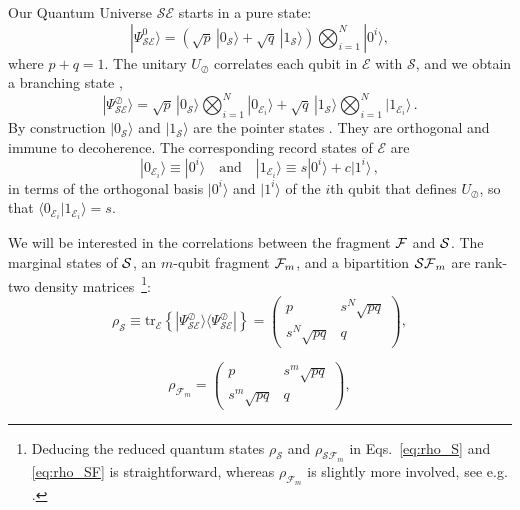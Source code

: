 \documentclass[aps,prl,showpacs,amsmath,amssymb,amsfonts,lengthcheck,twocolumn,longbibliography,superscriptaddress]{revtex4-2}
\newcommand{\ptr}[2]{\mathrm{tr_{#1}}\left\{#2\right\}}
\newcommand{\bra}[1]    {\langle #1|}
\newcommand{\ket}[1]    {| #1 \rangle}
\newcommand{\bk}[2]     {\langle #1 | #2 \rangle}
\newcommand{\cS}        {{\mathcal S}}
\newcommand{\cE}        {{\mathcal E}}
\newcommand{\+}         {\dagger}
\newcommand{\mc}[1]{\mathcal{#1}}
\begin{document}
Our Quantum Universe $\cS\cE$ starts in a pure state:
\begin{equation}
\ket{\Psi_\mathcal{SE}^0} = \left(\sqrt{p}\, \ket { 0_\mathcal{S}} + \sqrt{q}\, \ket { 1_\mathcal{S}} \right) \bigotimes_{i=1}^{N} \ket {0^{i}} ,
\end{equation}
where $p+q=1$. The unitary $U_{\oslash}$ correlates each qubit in $\cE$ with $\mc{S}$,  and we obtain a branching state \cite{blume2005simple},
\begin{equation}
\ket{ \Psi^{\oslash}_\mathcal{SE}} = \sqrt{p}\,  \ket {0_\mathcal{S}} \bigotimes_{i=1}^{N} \ket { 0_{\cE_{i}}} + \sqrt{q}\,  \ket{1 _\mathcal{S}} \bigotimes_{i=1}^{N} \ket { 1_{\mathcal{E}_i}} \, .
\label{bstate}
\end{equation}
By construction $\ket{0_\mathcal{S}}$ and $\ket{1_\mathcal{S}}$ are the pointer states \cite{basis1,basis2}. They are orthogonal and immune to decoherence. The corresponding record states of $\mc{E}$ are
\begin{equation}
\ket { 0_{\cE_{i}}}  \equiv \ket{0^i}\quad\text{and}\quad \ket { 1_{\mathcal{E}_i}} \equiv s \ket{0^i}+ c \ket{1^i}\,,
\end{equation}
in terms of the orthogonal basis $\ket{0^i}$ and $\ket{1^i}$ of the $i$th qubit that defines $U_\oslash$, so that $\bk { 0_{\cE_{i}}} { 1_{\mathcal{E}_i}}= s$.

We will be interested in the correlations between the fragment $\cal F$ and $\cal S$. The marginal states of ${\cal S}$, an $m$-qubit fragment ${\cal F}_{m}$, and a bipartition ${\cal SF}_m$ are rank-two density matrices~\footnote{Deducing the reduced quantum states $\rho_\mathcal{S}$ and $\rho_{\mathcal{S}\mathcal{F}_m}$ in Eqs.~\eqref{eq:rho_S} and \eqref{eq:rho_SF} is straightforward, whereas $\rho_{\mathcal{F}_m}$ is slightly more involved, see e.g. \cite{ZQZ10}.}:
\begin{equation}
\label{eq:rho_S}
\rho_\mathcal{S}\equiv\ptr{\mc{E}}{\ket{ \Psi^{\oslash}_\mathcal{SE}}\bra{\Psi^{\oslash}_\mathcal{SE}} }=
\begin{pmatrix}
p & s^{N}\sqrt{pq}  \\
s^{N}\sqrt{pq}  & q 
\end{pmatrix} ,
\end{equation}

\begin{equation}
\label{eq:rho_F}
\rho_{\mathcal{F}_m}=
\begin{pmatrix}
p & s^{m}\sqrt{pq}  \\
s^{m}\sqrt{pq}  & q
\end{pmatrix},
\end{equation} 
\end{document}
